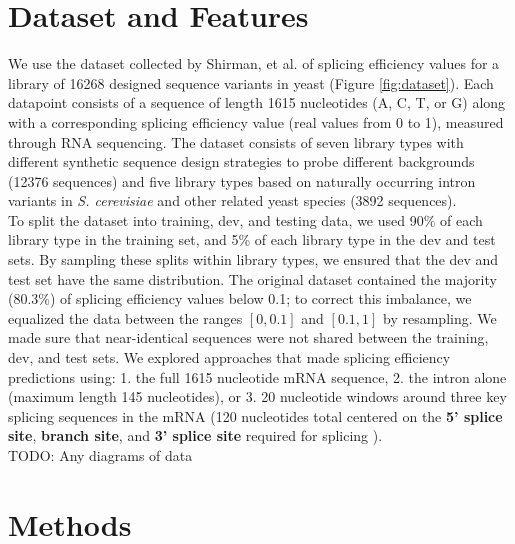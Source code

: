 \documentclass{article}
\begin{document}
\section{Dataset and Features}
We use the dataset collected by Shirman, et al. \cite{pilpel} of splicing efficiency values for a library of 16268 designed sequence variants in yeast (Figure \ref{fig:dataset}). Each datapoint consists of a sequence of length 1615 nucleotides (A, C, T, or G) along with a corresponding splicing efficiency value (real values from 0 to 1), measured through RNA sequencing. The dataset consists of seven library types with different synthetic sequence design strategies to probe different backgrounds (12376 sequences) and five library types based on naturally occurring intron variants in {\it S. cerevisiae} and other related yeast species (3892 sequences).
\newline \\
To split the dataset into training, dev, and testing data, we used 90\% of each library type in the training set, and 5\% of each library type in the dev and test sets. By sampling these splits within library types, we ensured that the dev and test set have the same distribution. The original dataset contained the majority (80.3\%) of splicing efficiency values below 0.1; to correct this imbalance, we equalized the data between the ranges $[0, 0.1]$ and $[0.1, 1]$ by resampling. We made sure that near-identical sequences were not shared between the training, dev, and test sets. We explored approaches that made splicing efficiency predictions using: 1. the full 1615 nucleotide mRNA sequence, 2. the intron alone (maximum length 145 nucleotides), or 3. 20 nucleotide windows around three key splicing sequences in the mRNA (120 nucleotides total centered on the {\bf 5' splice site}, {\bf branch site}, and  {\bf 3' splice site} required for splicing \cite{splicingreview}).
\newline \\
TODO: Any diagrams of data

\section{ Methods }
\end{document}
